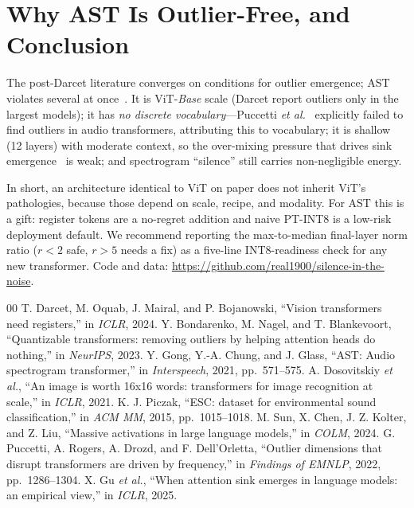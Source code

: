 \documentclass{article}
\begin{document}
\section{Why AST Is Outlier-Free, and Conclusion}
The post-Darcet literature converges on conditions for outlier emergence; AST violates several at once~\cite{darcet2024need,sun2024massive,puccetti2022outlier,gu2025emergence}. It is ViT-\emph{Base} scale (Darcet report outliers only in the largest models); it has \emph{no discrete vocabulary}---Puccetti \emph{et al.}~\cite{puccetti2022outlier} explicitly failed to find outliers in audio transformers, attributing this to vocabulary; it is shallow (12 layers) with moderate context, so the over-mixing pressure that drives sink emergence~\cite{gu2025emergence} is weak; and spectrogram ``silence'' still carries non-negligible energy.

In short, an architecture identical to ViT on paper does not inherit ViT's pathologies, because those depend on scale, recipe, and modality. For AST this is a gift: register tokens are a no-regret addition and naive PT-INT8 is a low-risk deployment default. We recommend reporting the max-to-median final-layer norm ratio ($r{<}2$ safe, $r{>}5$ needs a fix) as a five-line INT8-readiness check for any new transformer. Code and data: \url{https://github.com/real1900/silence-in-the-noise}.

\begin{thebibliography}{00}
 T. Darcet, M. Oquab, J. Mairal, and P. Bojanowski, ``Vision transformers need registers,'' in \emph{ICLR}, 2024.
 Y. Bondarenko, M. Nagel, and T. Blankevoort, ``Quantizable transformers: removing outliers by helping attention heads do nothing,'' in \emph{NeurIPS}, 2023.
 Y. Gong, Y.-A. Chung, and J. Glass, ``AST: Audio spectrogram transformer,'' in \emph{Interspeech}, 2021, pp.\ 571--575.
 A. Dosovitskiy \emph{et al.}, ``An image is worth 16x16 words: transformers for image recognition at scale,'' in \emph{ICLR}, 2021.
 K. J. Piczak, ``ESC: dataset for environmental sound classification,'' in \emph{ACM MM}, 2015, pp.\ 1015--1018.
 M. Sun, X. Chen, J. Z. Kolter, and Z. Liu, ``Massive activations in large language models,'' in \emph{COLM}, 2024.
 G. Puccetti, A. Rogers, A. Drozd, and F. Dell'Orletta, ``Outlier dimensions that disrupt transformers are driven by frequency,'' in \emph{Findings of EMNLP}, 2022, pp.\ 1286--1304.
 X. Gu \emph{et al.}, ``When attention sink emerges in language models: an empirical view,'' in \emph{ICLR}, 2025.
\end{thebibliography}
\end{document}
